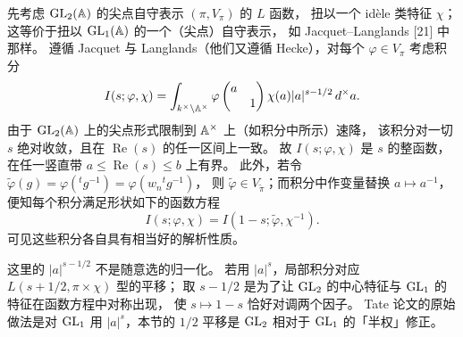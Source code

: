 先考虑 $\mathrm{GL}_2(\mathbb{A})$ 的尖点自守表示 $(\pi,V_\pi)$ 的 $L$ 函数，
扭以一个 id\`ele 类特征 $\chi$；这等价于扭以 $\mathrm{GL}_1(\mathbb{A})$ 的一个（尖点）自守表示，
如 Jacquet--Langlands [21] 中那样。
遵循 Jacquet 与 Langlands（他们又遵循 Hecke），对每个 $\varphi\in V_\pi$ 考虑积分
\[
I(s;\varphi,\chi)=\int_{k^\times\backslash\mathbb{A}^\times}
\varphi\begin{pmatrix}a&\\&1\end{pmatrix}\chi(a)|a|^{s-1/2}\,d^\times a.
\]
由于 $\mathrm{GL}_2(\mathbb{A})$ 上的尖点形式限制到 $\mathbb{A}^\times$ 上（如积分中所示）速降，
该积分对一切 $s$ 绝对收敛，且在 $\operatorname{Re}(s)$ 的任一区间上一致。
故 $I(s;\varphi,\chi)$ 是 $s$ 的整函数，在任一竖直带 $a\le\operatorname{Re}(s)\le b$ 上有界。
此外，若令 $\widetilde{\varphi}(g)=\varphi({}^tg^{-1})=\varphi(w_n{}^tg^{-1})$，
则 $\widetilde{\varphi}\in V_{\widetilde{\pi}}$；而积分中作变量替换 $a\mapsto a^{-1}$，
便知每个积分满足形状如下的函数方程
\[
I(s;\varphi,\chi)=I(1-s;\widetilde{\varphi},\chi^{-1}).
\]
可见这些积分各自具有相当好的解析性质。
\begin{annote}
这里的 $|a|^{s-1/2}$ 不是随意选的归一化。
若用 $|a|^{s}$，局部积分对应 $L(s+1/2,\pi\times\chi)$ 型的平移；
取 $s-1/2$ 是为了让 $\mathrm{GL}_2$ 的中心特征与 $\mathrm{GL}_1$ 的特征在函数方程中对称出现，
使 $s\mapsto1-s$ 恰好对调两个因子。
Tate 论文的原始做法是对 $\mathrm{GL}_1$ 用 $|a|^s$，本节的 $1/2$ 平移是 $\mathrm{GL}_2$
相对于 $\mathrm{GL}_1$ 的「半权」修正。
\par{}
\end{annote}


